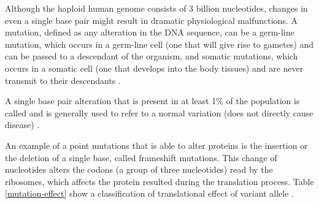 Although the haploid human genome consists of 3 billion nucleotides,
changes in even a single base pair might result in dramatic physiological malfunctions.
A mutation, defined as any alteration in the DNA sequence,
can be a  germ-line mutation, which occurs in a germ-line cell
(one that will give rise to gametes) and
can be passed to a descendant of the organism, and somatic mutations,
which occurs in a somatic cell (one that develops into the body tissues) and
are never transmit to their descendants \cite{clancy2008genetic}.


 A single base pair alteration that is present in at least 1\% of the population
is called   and is generally used to refer to a
normal variation (does not directly cause disease) \cite{clancy2008genetic}.

An example of a point mutations that is able to alter proteins is the insertion or the deletion of a single base, called frameshift mutations. This change of nucleotides alters the codons (a group of three nucleotides) read by the ribosomes, which
 affects the protein resulted during the translation process. Table \ref{mutation-effect}
 show a classification of translational effect of variant allele \cite{GTAK_maf,maf}.

